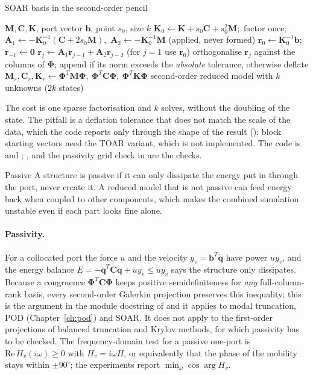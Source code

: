 \begin{algbox}{SOAR basis in the second-order pencil}
\begin{pseudo}
\Require $\bm M,\bm C,\bm K$, port vector $\bm b$, point $s_0$, size $k$
\State $\bm K_0\gets\bm K+s_0\bm C+s_0^2\bm M$;\ factor once;\ $\bm A_1\gets-\bm K_0^{-1}(\bm C+2s_0\bm M)$,\ $\bm A_2\gets-\bm K_0^{-1}\bm M$ (applied, never formed)
\State $\bm r_0\gets\bm K_0^{-1}\bm b$;\ $\bm r_{-1}\gets\bm 0$
  \State $\bm r_j\gets\bm A_1\bm r_{j-1}+\bm A_2\bm r_{j-2}$ (for $j=1$ use $\bm r_0$)
  \State orthogonalise $\bm r_j$ against the columns of $\bm\Phi$; append if its norm exceeds the \emph{absolute} tolerance, otherwise deflate
\EndFor
\State $\bm M_r,\bm C_r,\bm K_r\gets\bm\Phi^T\bm M\bm\Phi,\ \bm\Phi^T\bm C\bm\Phi,\ \bm\Phi^T\bm K\bm\Phi$ 
\Ensure second-order reduced model with $k$ unknowns ($2k$ states)
\end{pseudo}
\end{algbox}

The cost is one sparse factorisation and $k$ solves, without the doubling of the state. The pitfall is a deflation tolerance that does not match the scale of the data, which the code reports only through the shape of the result (); block starting vectors need the TOAR variant, which is not implemented. The code is  and ; ,  and the passivity grid check in  are the checks.

\begin{sidenote}{Passive}
A structure is passive if it can only dissipate the energy put in through the port, never create it. A reduced model that is not passive can feed energy back when coupled to other components, which makes the combined simulation unstable even if each part looks fine alone.
\end{sidenote}

\paragraph{Passivity.}
For a collocated port the force $u$ and the velocity $y_v=\bm b^T\dot{\bm q}$ have power $uy_v$, and the energy balance $\dot E=-\dot{\bm q}^T\bm C\dot{\bm q}+uy_v\le uy_v$ says the structure only dissipates. Because a congruence $\bm\Phi^T\bm C\bm\Phi$ keeps positive semidefiniteness for \emph{any} full-column-rank basis, every second-order Galerkin projection preserves this inequality; this is the argument in the module docstring of  and it applies to modal truncation, POD (Chapter~\ref{ch:pod}) and SOAR. It does not apply to the first-order projections of balanced truncation and Krylov methods, for which passivity has to be checked. The frequency-domain test for a passive one-port is $\mathrm{Re}\,H_v(i\omega)\ge0$ with $H_v=i\omega H$, or equivalently that the phase of the mobility stays within $\pm90^\circ$; the experiments report $\min_\omega\cos\arg H_v$.

